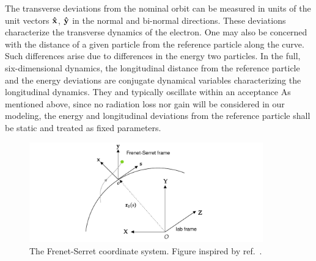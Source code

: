 The transverse deviations from the nominal orbit can be measured in units of the unit vectors $\vu{x}$, $\vu{y}$ in the normal and bi-normal directions. These deviations characterize the transverse dynamics of the electron. One may also be concerned with the distance of a given particle from the reference particle along the curve. Such differences arise due to differences in the energy two particles. In the full, six-dimensional dynamics, the longitudinal distance from the reference particle and the energy deviations are conjugate dynamical variables characterizing the longitudinal dynamics. They and typically oscillate within an acceptance As mentioned above, since no radiation loss nor gain will be considered in our modeling, the energy and longitudinal deviations from the reference particle shall be static and treated as fixed parameters.

\begin{figure}[htb]
    \centering
    \includegraphics[width=0.9\textwidth]{Images/frenetserret.pdf}
    \caption[The Frenet-Serret coordinate system]{The Frenet-Serret coordinate system. Figure inspired by ref.~\cite{huang_beam-based_2019}.}
    \label{fig:frenet-serret}
\end{figure}

